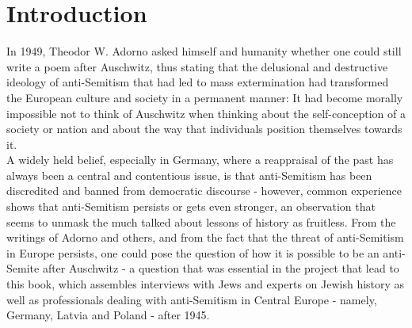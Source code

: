 \section{Introduction}
\vspace*{3em}
In 1949, Theodor W. Adorno asked himself and humanity whether one could still write a poem after Auschwitz, thus stating that the delusional and destructive ideology of anti-Semitism that had led to mass extermination had transformed the European culture and society in a permanent manner: It had become morally impossible not to think of Auschwitz when thinking about the self-conception of a society or nation and about the way that individuals position themselves towards it.\\
A widely held belief, especially in Germany, where a reappraisal of the past has always been a central and contentious issue, is that anti-Semitism has been discredited and banned from democratic discourse - however, common experience shows that anti-Semitism persists or gets even stronger, an observation that seems to unmask the much talked about lessons of history as fruitless. From the writings of Adorno and others, and from the fact that the threat of anti-Semitism in Europe persists, one could pose the question of how it is possible to be an anti-Semite after Auschwitz - a question that was essential in the project that lead to this book, which assembles interviews with Jews and experts on Jewish history as well as professionals dealing with anti-Semitism in Central Europe - namely, Germany, Latvia and Poland - after 1945.
